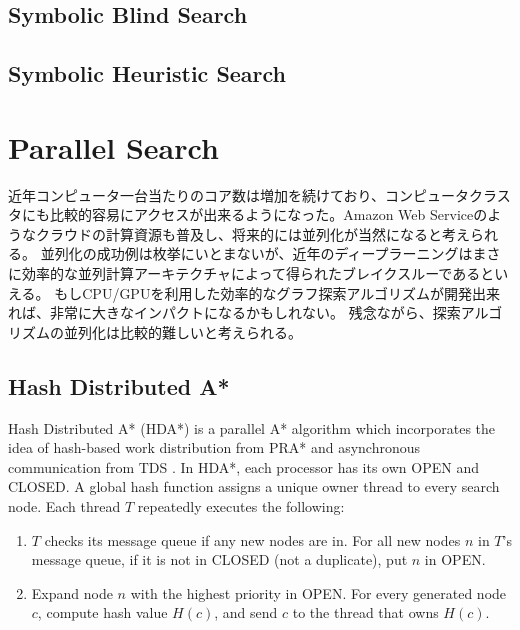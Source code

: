 \documentclass{report}
\begin{document}
\subsection{Symbolic Blind Search}


\subsection{Symbolic Heuristic Search}


\section{Parallel Search}
近年コンピュータ一台当たりのコア数は増加を続けており、コンピュータクラスタにも比較的容易にアクセスが出来るようになった。Amazon Web Serviceのようなクラウドの計算資源も普及し、将来的には並列化が当然になると考えられる。
並列化の成功例は枚挙にいとまないが、近年のディープラーニングはまさに効率的な並列計算アーキテクチャによって得られたブレイクスルーであるといえる。
もしCPU/GPUを利用した効率的なグラフ探索アルゴリズムが開発出来れば、非常に大きなインパクトになるかもしれない。
残念ながら、探索アルゴリズムの並列化は比較的難しいと考えられる。



\subsection{Hash Distributed A*}

Hash Distributed A* (HDA*) \cite{kishimotofb13} is a parallel A* algorithm 
which incorporates the idea of hash-based work distribution from  PRA* \cite{evett1995massively} and asynchronous communication from TDS \cite{romein1999transposition}.
In HDA*, 
each processor has its own OPEN and CLOSED.
A global hash function assigns a unique owner thread to every search node.
Each thread $T$ repeatedly executes the following: 
\begin{enumerate}
	\item 
           $T$ checks its message queue if any new nodes are in. For all new nodes $n$ in $T$'s message queue, if it is not in CLOSED (not a duplicate), put $n$ in OPEN. %
	\item 
           Expand node $n$ with the highest priority in OPEN. For every generated node $c$, compute hash value $H(c)$, and send $c$ to the thread that owns $H(c)$. %
\end{enumerate}
\end{document}
